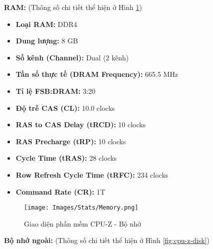 \noindent\textbf{\large RAM:} (Thông số chi tiết thể hiện ở Hình \ref{fig:cpu-z-memory})

\begin{itemize}
    \item \textbf{Loại RAM:} DDR4
    \item \textbf{Dung lượng:} 8 GB
    \item \textbf{Số kênh (Channel):} Dual (2 kênh)
    \item \textbf{Tần số thực tế (DRAM Frequency):} 665.5 MHz
    \item \textbf{Tỉ lệ FSB:DRAM:} 3:20
    \item \textbf{Độ trễ CAS (CL):} 10.0 clocks
    \item \textbf{RAS to CAS Delay (tRCD):} 10 clocks
    \item \textbf{RAS Precharge (tRP):} 10 clocks
    \item \textbf{Cycle Time (tRAS):} 28 clocks
    \item \textbf{Row Refresh Cycle Time (tRFC):} 234 clocks
    \item \textbf{Command Rate (CR):} 1T
\end{itemize}

\begin{center}
\end{center}

\begin{figure}[H]
    \centering
    \texttt{[image: Images/Stats/Memory.png]}
    \caption{Giao diện phần mềm CPU-Z - Bộ nhớ}
    \label{fig:cpu-z-memory}
\end{figure}

\noindent\textbf{\large Bộ nhớ ngoài:} (Thông số chi tiết thể hiện ở Hình \ref{fig:cpu-z-disk})

